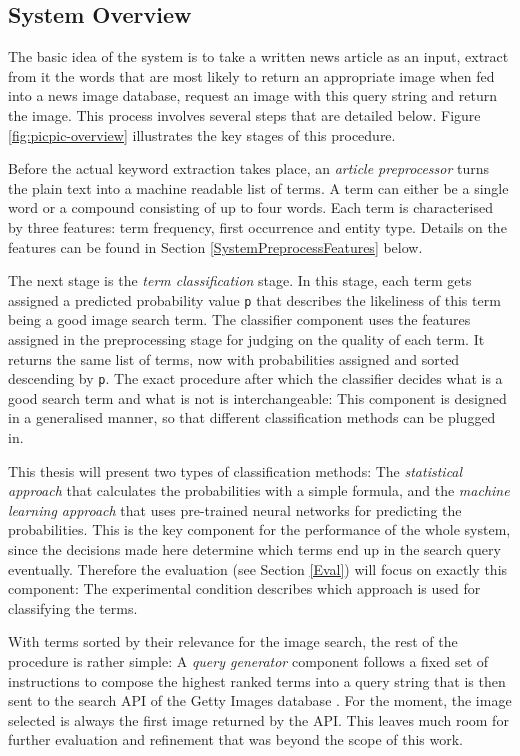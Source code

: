 \documentclass[11pt,a4paper,twoside]{article}
\begin{document}
\subsection{System Overview} \label{SystemOverview}

The basic idea of the system is to take a written news article as an input, extract from it the words that are most likely to return an appropriate image when fed into a news image database, request an image with this query string and return the image. This process involves several steps that are detailed below. Figure \ref{fig:picpic-overview} illustrates the key stages of this procedure.

Before the actual keyword extraction takes place, an \emph{article preprocessor} turns the plain text into a machine readable list of terms. A term can either be a single word or a compound consisting of up to four words. Each term is characterised by three features: term frequency, first occurrence and entity type. Details on the features can be found in Section \ref{SystemPreprocessFeatures} below.

The next stage is the \emph{term classification} stage. In this stage, each term gets assigned a predicted probability value \lstinline|p| that describes the likeliness of this term being a good image search term. The classifier component uses the features assigned in the preprocessing stage for judging on the quality of each term. It returns the same list of terms, now with probabilities assigned and sorted descending by \lstinline{p}. The exact procedure after which the classifier decides what is a good search term and what is not is interchangeable: This component is designed in a generalised manner, so that different classification methods can be plugged in.

This thesis will present two types of classification methods: The \emph{statistical approach} that calculates the probabilities with a simple formula, and the \emph{machine learning approach} that uses pre-trained neural networks for predicting the probabilities. This is the key component for the performance of the whole system, since the decisions made here determine which terms end up in the search query eventually. Therefore the evaluation (see Section \ref{Eval}) will focus on exactly this component: The experimental condition describes which approach is used for classifying the terms.

With terms sorted by their relevance for the image search, the rest of the procedure is rather simple: A \emph{query generator} component follows a fixed set of instructions to compose the highest ranked terms into a query string that is then sent to the search API of the Getty Images database \cite{GettyImagesAPIOverview}. For the moment, the image selected is always the first image returned by the API. This leaves much room for further evaluation and refinement that was beyond the scope of this work.
\end{document}
